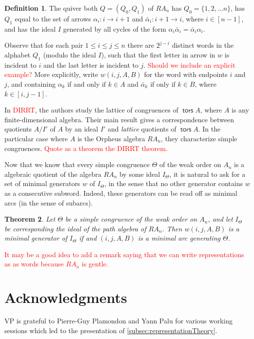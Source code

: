 \documentclass{amsart}
\newtheorem{theorem}{Theorem}[section]
\theoremstyle{definition}
\newtheorem{definition}[theorem]{Definition}
\DeclareMathOperator{\tors}{\mathsf{tors}}
\begin{document}
\begin{definition}
The quiver both $Q=(Q_0,Q_1)$ of $RA_n$ has $Q_0 = \{1,2,\ldots n\}$, has $Q_1$ equal to the set of arrows $\alpha_{i}: i \to i+1$
 and $\bar{\alpha}_i:i+1\to i$, where $i\in [n-1]$, and has the ideal $I$ generated by all cycles of the form $\alpha_i\bar{\alpha}_{i} = \bar{\alpha}_i\alpha_i$.
\end{definition}

Observe that for each pair $1\le i\le j\le n$ there are $2^{j-i}$ distinct words in the alphabet $Q_1$ (modulo the ideal $I$), such that the first letter in arrow in $w$ is incident to $i$ and the last letter is incident to $j$. \textcolor{red}{Should we include an explicit example?}
More explicitly, write $w(i,j,A,B)$ for the word with endpoints $i$ and $j$, and containing $\alpha_k$ if and only if $k\in A$ and $\bar{\alpha}_k$ if only if $k\in B$, where $k\in [i,j-1]$.

In \textcolor{red}{DIRRT}, the authors study the lattice of congruences of $\tors A$, where $A$ is any finite-dimensional algebra.
Their main result gives a correspondence between quotients $A/I'$ of $A$ by an ideal $I'$ and \emph{lattice} quotients of $\tors A$.
In the particular case where $A$ is the Orpheus algebra $RA_n$, they characterize simple congruences.
\textcolor{red}{Quote as a theorem the DIRRT theorem.}

Now that we know that every simple congruence $\Theta$ of the weak order on $A_n$ is a algebraic quotient of the algebra $RA_n$ by some ideal $I_{\Theta}$, it is natural to ask for a set of minimal generators $w$ of $I_{\Theta}$, in the sense that no other generator contains $w$ as a consecutive subword.
Indeed, these generators can be read off as minimal arcs (in the sense of subarcs).

\begin{theorem}
Let $\Theta$ be a simple congruence of the weak order on $A_n$, and let $I_{\Theta}$ be corresponding the ideal of the path algebra of $RA_n$. 
Then $w(i,j,A,B)$ is a minimal generator of $I_{\Theta}$ if and $(i,j,A,B)$ is a minimal arc generating $\Theta$.
\end{theorem}
\textcolor{red}{It may be a good idea to add a remark saying that we can write representations as as words because $RA_n$ is gentle. }


\section*{Acknowledgments}

VP is grateful to Pierre-Guy Plamondon and Yann Palu for various working sessions which led to the presentation of \cref{subsec:representationTheory}.




\label{sec:biblio}
\end{document}
